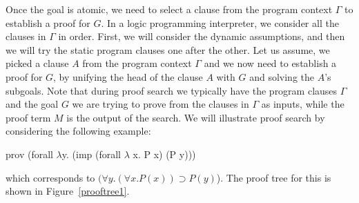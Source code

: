 \documentclass{acmconf}
\newcommand{\impl}{\supset}
\newcommand{\impI}{\textsf{impI}}
\newcommand{\allI}{\textsf{allI}}
\newcommand{\allE}{\textsf{allE}}
\newcommand{\impE}{\textsf{impE}}
\newcommand{\vd}{\vdash}
\begin{document}
Once the goal is atomic, we need to select a clause from the
program context $\Gamma$ to establish a proof for $G$. In a logic
programming interpreter, we consider all the clauses in $\Gamma$ in order. 
First, we will consider the dynamic assumptions, and then we will try
the static program clauses one after the other. 
Let us assume, we picked a clause $A$ from the program context
$\Gamma$ and we now need to establish a proof for $G$, by unifying the
head of the clause $A$ with $G$ and solving the $A$'s subgoals.
Note that during proof search we typically have the program
clauses $\Gamma$ and the goal $G$ we are trying to prove from the
clauses in $\Gamma$ as inputs, while the proof term $M$ is the output
of the search. We will illustrate proof search by considering the
following example:  

\begin{code}
prov (forall $\lambda$y. (imp (forall $\lambda$ x. P x) (P y)))  
\end{code}


which corresponds to $(\forall y. (\forall x.P(x)) \impl P(y)$).  The
proof tree for this is shown in Figure~\ref{prooftree1}.


\end{document}
